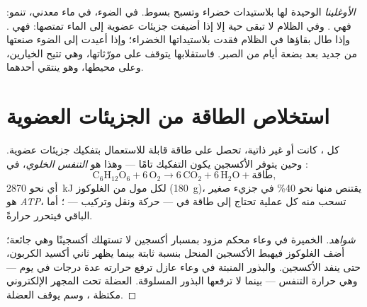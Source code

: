 \begin{example}\label{ex:g10:cell-metabolism:euglena}
\emph{الأوغلينا} الوحيدة  لها بلاستيدات خضراء وتسبح بسوط. في
الضوء، في ماء معدني، تنمو: فهي . وفي الظلام لا تبقى حية
إلا إذا أضيفت جزيئات عضوية إلى الماء تمتصها: فهي .
وإذا طال بقاؤها في الظلام فقدت بلاستيداتها الخضراء؛ وإذا أعيدت إلى
الضوء صنعتها من جديد بعد بضعة أيام من الصبر. فاستقلابها يتوقف على
مورّثاتها، وهي تتيح الخيارين، وعلى محيطها، وهو ينتقي أحدهما.
\end{example}

\section{استخلاص الطاقة من الجزيئات العضوية}

\begin{proposition}\label{prop:g10:cell-metabolism:respiration}
كل ،  كانت أو غير ذاتية، تحصل على طاقة قابلة للاستعمال
بتفكيك جزيئات عضوية. وحين يتوفر الأكسجين يكون التفكيك تامًا --- وهذا
هو \emph{التنفس الخلوي}، في :
\[
\mathrm{C_6H_{12}O_6} + 6\,\mathrm{O_2} \longrightarrow
6\,\mathrm{CO_2} + 6\,\mathrm{H_2O} + \text{طاقة},
\]
أي نحو \qty{2870}{kJ} لكل مول من الغلوكوز (\qty{180}{g})، يقتنص منها
نحو 40\% في جزيء صغير هو \emph{ATP}، تسحب منه كل عملية
تحتاج إلى طاقة في  --- حركة ونقل وتركيب --- ؛ أما الباقي فيتحرر
حرارةً.
\end{proposition}
\begin{proof}[شواهد]
الخميرة في وعاء محكم مزود بمسبار أكسجين لا تستهلك أكسجينًا وهي جائعة؛
أضف الغلوكوز فيهبط الأكسجين المنحل بنسبة ثابتة بينما يظهر ثاني أكسيد
الكربون، حتى ينفد الأكسجين. والبذور المنبتة في وعاء عازل ترفع حرارته
عدة درجات في يوم --- وهي حرارة التنفس --- بينما لا ترفعها البذور
المسلوقة.  العضلة تحت المجهر الإلكتروني مكتظة ، وسم
 يوقف العضلة.
\end{proof}

